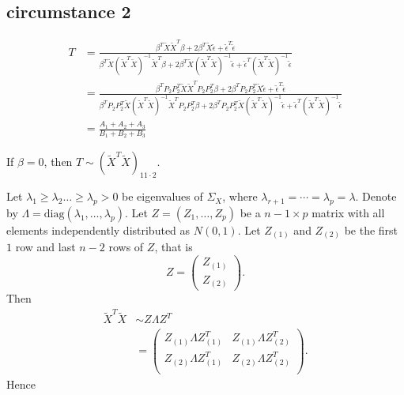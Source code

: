 \documentclass[review]{elsarticle}
\theoremstyle{plain}
\theoremstyle{definition}
\theoremstyle{remark}
\begin{document}
\subsection{circumstance 2}


\begin{equation}
    \begin{aligned}
        T&=\frac{\beta^T \tilde{X}\tilde{X}^T \beta+
        2\beta^T \tilde{X}\tilde{\epsilon}+
        \tilde{\epsilon}^T\tilde{\epsilon}
    }{\beta^T \tilde{X}{(\tilde{X}^T\tilde{X})}^{-1}\tilde{X}^T \beta+
        2\beta^T \tilde{X}{(\tilde{X}^T\tilde{X})}^{-1}\tilde{\epsilon}+
        \tilde{\epsilon}^T{(\tilde{X}^T\tilde{X})}^{-1}\tilde{\epsilon}
    }\\
        &=\frac{\beta^T P_2 P_2^T \tilde{X}\tilde{X}^T P_2 P_2^T\beta+
        2\beta^T P_2 P_2^T \tilde{X}\tilde{\epsilon}+
        \tilde{\epsilon}^T\tilde{\epsilon}
    }{\beta^T P_2 P_2^T\tilde{X}{(\tilde{X}^T\tilde{X})}^{-1}\tilde{X}^T P_2 P_2^T\beta+
        2\beta^T P_2 P_2^T\tilde{X}{(\tilde{X}^T\tilde{X})}^{-1}\tilde{\epsilon}+
        \tilde{\epsilon}^T{(\tilde{X}^T\tilde{X})}^{-1}\tilde{\epsilon}
    }\\
        &=\frac{A_1+A_2+A_3}{B_1+B_2+B_3}
    \end{aligned}
\end{equation}

If $\beta=0$, then $T\sim {(\tilde{X}^T\tilde{X})}_{11\cdot 2}$.

Let $\lambda_1\geq \lambda_2\ldots \geq \lambda_p>0$ be eigenvalues of $\Sigma_X$, where $\lambda_{r+1}=\cdots=\lambda_p=\lambda$. 
Denote by $\Lambda=\textrm{diag} (\lambda_1,\ldots,\lambda_p)$. Let $Z=(Z_1,\ldots,Z_p)$ be a $n-1\times p$ matrix with all elements independently distributed as $N(0,1)$. Let $Z_{(1)}$ and $Z_{(2)}$ be the first $1$ row and last $n-2$ rows of $Z$, that is
\[
    Z=\begin{pmatrix} 
        Z_{(1)}\\
        Z_{(2)}
    \end{pmatrix}.
    \]
Then
\begin{equation}
    \begin{aligned}
        \tilde{X}^T\tilde{X}&\sim Z\Lambda Z^T\\
        &=\begin{pmatrix}
            Z_{(1)}\Lambda Z_{(1)}^T & Z_{(1)}\Lambda Z_{(2)}^T\\
            Z_{(2)}\Lambda Z_{(1)}^T & Z_{(2)}\Lambda Z_{(2)}^T\\
        \end{pmatrix}.
    \end{aligned}
\end{equation}
Hence
\end{document}
